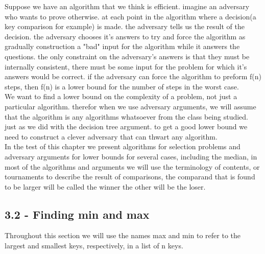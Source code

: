 \documentclass[a4paper,10pt,titlepage]{report}
\begin{document}
Suppose we have an algorithm that we think is efficient. imagine an adversary who wants to prove otherwise. at each point in the algorithm where a decision(a key comparison for example) is made. the adversary tells us the result of the decision. the adversary chooses it's answers to try and force the algorithm as gradually construction a "bad" input for the algorithm while it answers the questions. the only constraint on the adversary's answers is that they must be internally consistent, there must be some input for the problem for which it's answers would be correct. if the adversary can force the algorithm to preform f(n) steps, then f(n) is a lower bound for the number of steps in the worst case.\\
We want to find a lower bound on the complexity of a problem, not just a particular algorithm. therefor when we use adversary arguments, we will assume that the algorithm is any algorithms whatsoever from the class being studied. just as we did with the decision tree argument. to get a good lower bound we need to construct a clever adversary that can thwart any algorithm.\\
In the test of this chapter we present algorithms for selection problems and adversary arguments for lower bounds for several cases, including the median, in most of the algorithms and arguments we will use the terminology of contents, or tournaments to describe the result of comparisons, the comparand that is found to be larger will be called the winner the other will be the loser.

\subsection{3.2 - Finding min and max}
Throughout this section we will use the names max and min to refer to the largest and smallest keys, respectively, in a list of n keys.\\
\end{document}
